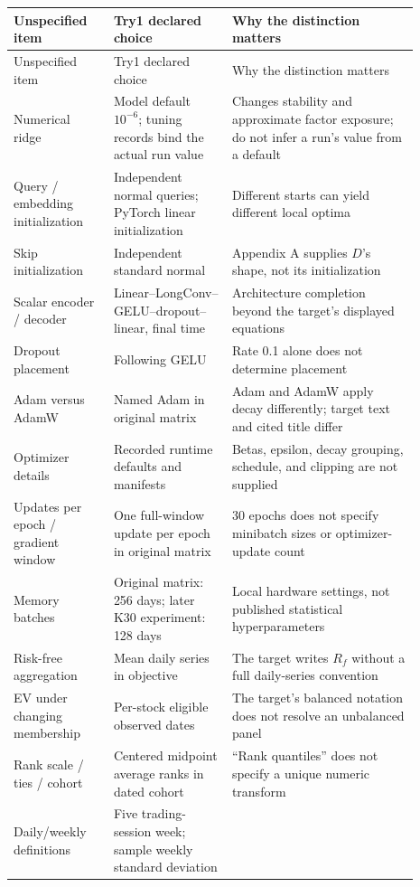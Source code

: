 \documentclass[11pt]{article}
\begin{document}
\small
\begin{longtable}{p{0.22\linewidth}p{0.26\linewidth}p{0.41\linewidth}}
\toprule
Unspecified item & Try1 declared choice & Why the distinction matters\\
\midrule
\endfirsthead
\toprule Unspecified item & Try1 declared choice & Why the distinction matters\\\midrule
\endhead
Numerical ridge & Model default $10^{-6}$; tuning records bind the actual run value
& Changes stability and approximate factor exposure; do not infer a run's value from a default\\
Query / embedding initialization & Independent normal queries; PyTorch linear initialization
& Different starts can yield different local optima\\
Skip initialization & Independent standard normal
& Appendix A supplies $D$'s shape, not its initialization\\
Scalar encoder / decoder & Linear--LongConv--GELU--dropout--linear, final time
& Architecture completion beyond the target's displayed equations\\
Dropout placement & Following GELU & Rate 0.1 alone does not determine placement\\
Adam versus AdamW & Named Adam in original matrix
& Adam and AdamW apply decay differently; target text and cited title differ\\
Optimizer details & Recorded runtime defaults and manifests
& Betas, epsilon, decay grouping, schedule, and clipping are not supplied\\
Updates per epoch / gradient window & One full-window update per epoch in original matrix
& 30 epochs does not specify minibatch sizes or optimizer-update count\\
Memory batches & Original matrix: 256 days; later K30 experiment: 128 days
& Local hardware settings, not published statistical hyperparameters\\
Risk-free aggregation & Mean daily series in objective
& The target writes $R_f$ without a full daily-series convention\\
EV under changing membership & Per-stock eligible observed dates
& The target's balanced notation does not resolve an unbalanced panel\\
Rank scale / ties / cohort & Centered midpoint average ranks in dated cohort
& ``Rank quantiles'' does not specify a unique numeric transform\\
Daily/weekly definitions & Five trading-session week; sample weekly standard deviation

\end{longtable}
\end{document}
